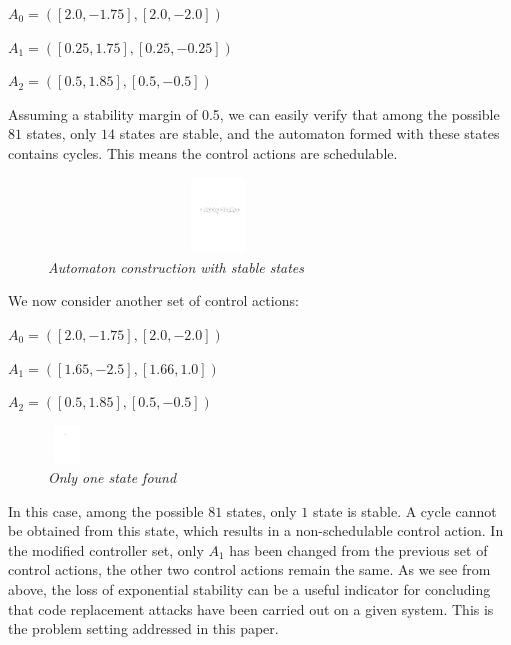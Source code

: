    $A_0 = ([2.0, -1.75],[2.0, -2.0])$
   
   $A_1 = ([0.25, 1.75],[0.25, -0.25])$

   $A_2 = ([0.5, 1.85],[0.5, -0.5])$
   
\noindent
Assuming a stability margin of 0.5, we can easily verify that among the possible $81$ states, only $14$ states are stable, and the automaton formed
with these states contains cycles. This means the control actions are schedulable.

\begin{figure}[h]
\begin{center}
\includegraphics[width=90mm, height=20mm]{schedulable_new.pdf}
\end{center}
\caption{{\em Automaton construction with stable states}}
\label{fig:cycle found}
\end{figure}


\noindent
We now consider another set of control actions:
   
   $A_0 = ([2.0, -1.75],[2.0, -2.0])$
   
   $A_1 = ([1.65, -2.5],[1.66, 1.0])$

   $A_2 = ([0.5, 1.85],[0.5, -0.5])$
   
\begin{figure}

\begin{center}
\includegraphics[width=10mm, height = 10mm]{non_schedulable.pdf}
\end{center}
\caption{{\em  Only one state found}}
\label{fig:Only one state}
\end{figure}

\noindent
In this case, among the possible $81$ states, only $1$ state is stable. A cycle cannot be obtained 
from this state, which results in a non-schedulable control action.
In the modified controller set, only $A_1$ has been changed from the previous 
set of control actions, the other 
two control actions remain the same. As we see from above, the loss of exponential stability can be a useful indicator for concluding that code replacement attacks have been carried out on a given system. This is the problem setting addressed in this paper.


